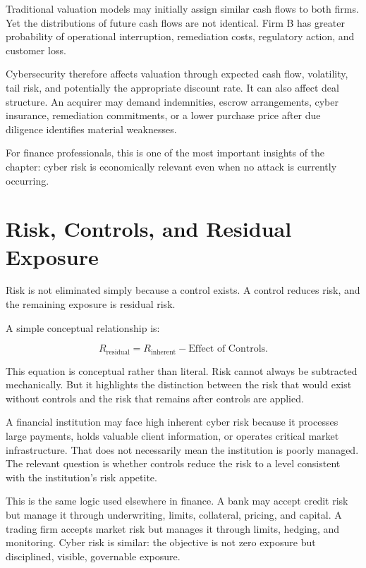 Traditional valuation models may initially assign similar cash flows to both firms. Yet the distributions of future cash flows are not identical. Firm B has greater probability of operational interruption, remediation costs, regulatory action, and customer loss.

Cybersecurity therefore affects valuation through expected cash flow, volatility, tail risk, and potentially the appropriate discount rate. It can also affect deal structure. An acquirer may demand indemnities, escrow arrangements, cyber insurance, remediation commitments, or a lower purchase price after due diligence identifies material weaknesses.

For finance professionals, this is one of the most important insights of the chapter: cyber risk is economically relevant even when no attack is currently occurring.

\section{Risk, Controls, and Residual Exposure}

Risk is not eliminated simply because a control exists. A control reduces risk, and the remaining exposure is residual risk.

A simple conceptual relationship is:

\begin{equation}
R_{\text{residual}}
=
R_{\text{inherent}}
-
\text{Effect of Controls}.
\end{equation}

This equation is conceptual rather than literal. Risk cannot always be subtracted mechanically. But it highlights the distinction between the risk that would exist without controls and the risk that remains after controls are applied.

A financial institution may face high inherent cyber risk because it processes large payments, holds valuable client information, or operates critical market infrastructure. That does not necessarily mean the institution is poorly managed. The relevant question is whether controls reduce the risk to a level consistent with the institution's risk appetite.

This is the same logic used elsewhere in finance. A bank may accept credit risk but manage it through underwriting, limits, collateral, pricing, and capital. A trading firm accepts market risk but manages it through limits, hedging, and monitoring. Cyber risk is similar: the objective is not zero exposure but disciplined, visible, governable exposure.

